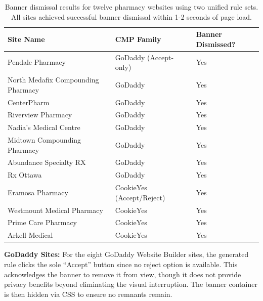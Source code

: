 \documentclass[conference]{IEEEtran}
\begin{document}
\begin{table}[!t]

\caption{Banner dismissal results for twelve pharmacy websites using two unified rule sets. All sites achieved successful banner dismissal within 1-2 seconds of page load.}

\label{tab:results}

\centering

\small

\begin{tabular}{lll}

\toprule

Site Name & CMP Family & Banner Dismissed? \\

\midrule

Pendale Pharmacy & GoDaddy (Accept-only) & Yes \\

North Medafix Compounding Pharmacy & GoDaddy & Yes \\

CenterPharm & GoDaddy & Yes \\

Riverview Pharmacy & GoDaddy & Yes \\

Nadia's Medical Centre & GoDaddy & Yes \\

Midtown Compounding Pharmacy & GoDaddy & Yes \\

Abundance Specialty RX & GoDaddy & Yes \\

Rx Ottawa & GoDaddy & Yes \\

\midrule

Eramosa Pharmacy & CookieYes (Accept/Reject) & Yes \\

Westmount Medical Pharmacy & CookieYes & Yes \\

Prime Care Pharmacy & CookieYes & Yes \\

Arkell Medical & CookieYes & Yes \\

\bottomrule

\end{tabular}

\end{table}

\textbf{GoDaddy Sites:} For the eight GoDaddy Website Builder sites, the generated rule clicks the sole ``Accept'' button since no reject option is available. This acknowledges the banner to remove it from view, though it does not provide privacy benefits beyond eliminating the visual interruption. The banner container is then hidden via CSS to ensure no remnants remain.
\end{document}
